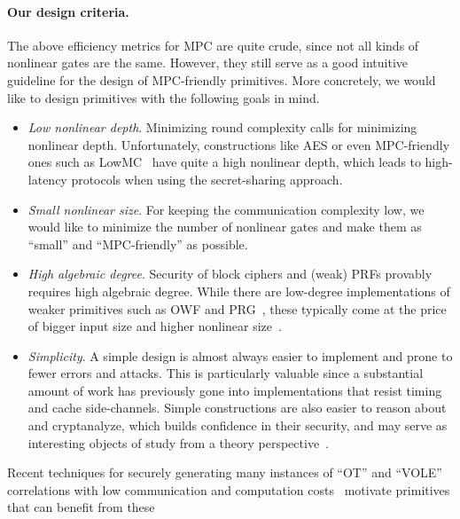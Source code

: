 \paragraph{Our design criteria.}  The above efficiency metrics for MPC are quite crude, since not all kinds of nonlinear gates are the same. However, they still serve as a good intuitive guideline for the design of MPC-friendly primitives. More concretely, we would like to design primitives with the following goals in mind.

\begin{itemize}
    \item \textit{Low nonlinear depth}. Minimizing round complexity calls for minimizing nonlinear depth. Unfortunately, constructions like AES or even MPC-friendly ones such as LowMC~\cite{albrecht2015-lowmc}
    have quite a high nonlinear depth, which leads to high-latency protocols when using the secret-sharing approach.
    
\item \textit{Small nonlinear size}.
 For keeping the communication complexity low, we would like to minimize the number of nonlinear gates and make them as ``small'' and ``MPC-friendly'' as possible. 

\item \textit{High algebraic degree}.
Security of block ciphers and (weak) PRFs provably requires high algebraic degree. While there are low-degree implementations of weaker primitives such as OWF and PRG~\cite{MQref,Goldreich,ApplebaumIK04}, these typically come at the price of bigger input size and higher nonlinear size~\cite{couteau2018-goldreich-prg,yang2021revisiting}.
    
    \item \textit{Simplicity}.  A simple design is almost always easier to implement and prone to fewer errors and attacks. This is particularly valuable since a substantial amount of work has previously gone into implementations that resist timing and cache side-channels. Simple constructions are also easier to reason about and cryptanalyze, which builds confidence in their security, and may serve as interesting objects of study from a theory perspective~\cite{Goldreich,MilesV15,AkaviaBGKR14}.
\end{itemize}

\iffalse     
    Recent techniques for securely generating many instances of ``OT'' and ``VOLE'' correlations  with low communication and computation costs~\cite{BCGI18,BCGKIS19,more} motivate primitives that can benefit from these
    
